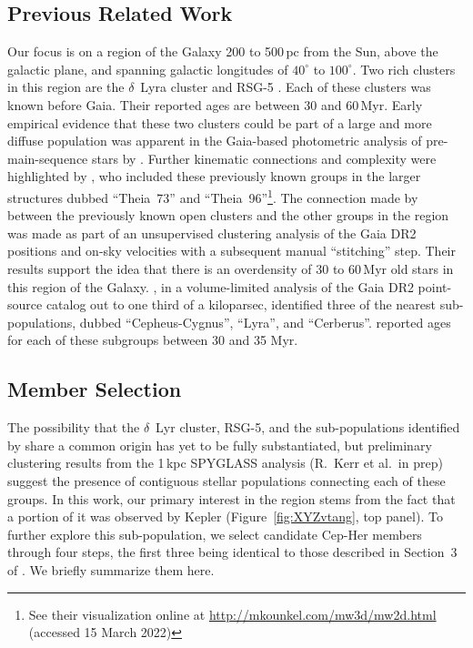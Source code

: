 \documentclass[12pt,twocolumn]{aastex63}
\begin{document}
\subsection{Previous Related Work}

Our focus is on a region of the Galaxy 200 to 500\,pc
from the Sun, above the galactic plane, and spanning galactic
longitudes of $40^\circ$ to $100^\circ$.  Two rich clusters in
this region are the $\delta$~Lyra cluster
\citep{stephenson_possible_1959} and RSG-5 \citep{roser_nine_2016}.
Each of these clusters was known before Gaia.  Their reported ages are
between 30 and 60\,Myr.  Early empirical evidence that these two
clusters could be part of a large and more diffuse population was
apparent in the Gaia-based photometric analysis of pre-main-sequence
stars by \citet[][see their Figures~11 and~13]{Zari2018}.  Further
kinematic connections and complexity were highlighted by
\citet{KounkelCovey2019}, who included these previously known groups
in the larger structures dubbed ``Theia~73'' and
``Theia~96''\footnote{See their visualization online at
\url{http://mkounkel.com/mw3d/mw2d.html} (accessed 15 March 2022)}.
The connection made by \citet{KounkelCovey2019} between the previously
known open clusters and the other groups in the region was made as
part of an unsupervised clustering analysis of the Gaia DR2 positions
and on-sky velocities with a subsequent manual ``stitching'' step.
Their results support the idea that there is an overdensity of 30 to
60\,Myr old stars in this region of the Galaxy.  \citet{Kerr2021}, in
a volume-limited analysis of the Gaia DR2 point-source catalog out to
one third of a kiloparsec, identified three of the nearest
sub-populations, dubbed ``Cepheus-Cygnus'', ``Lyra'', and
``Cerberus''.  \citet{Kerr2021} reported ages for each of these
subgroups between 30 and 35 Myr.


\subsection{Member Selection}
\label{subsec:members}

The possibility that the $\delta$~Lyr cluster, RSG-5, and the
sub-populations identified by \citet{Kerr2021} share a common origin
has yet to be fully substantiated, but preliminary clustering results
from the 1\,kpc SPYGLASS analysis (R.~Kerr et al.\ in prep) suggest
the presence of contiguous stellar populations connecting each of
these groups.  In this work, our primary interest in the region stems
from the fact that a portion of it was observed by Kepler
(Figure~\ref{fig:XYZvtang}, top panel).  To further explore this
sub-population, we select candidate Cep-Her members through four
steps, the first three being identical to those described in Section~3
of \citet{Kerr2021}.  We briefly summarize them here.
\end{document}
